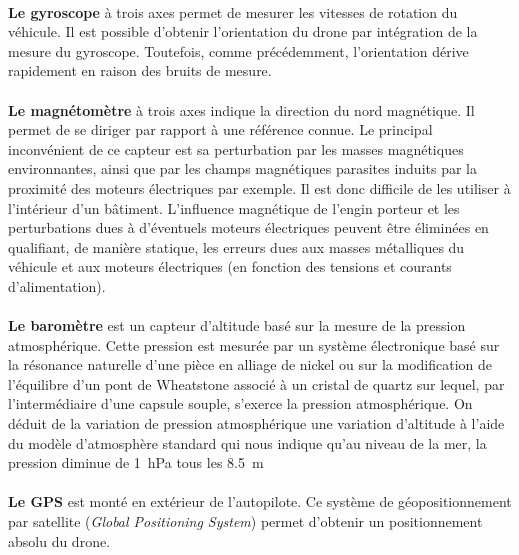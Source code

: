  \paragraph*{}
 \textbf{Le gyroscope} à trois axes permet de mesurer les vitesses de rotation du véhicule. Il est possible d'obtenir l'orientation du drone par intégration de la mesure du gyroscope. Toutefois, comme précédemment, l'orientation dérive rapidement en raison des bruits de mesure.

 \paragraph*{}
 \textbf{Le magnétomètre} à trois axes indique la direction du nord magnétique. Il permet de se diriger par rapport à une référence connue. Le principal inconvénient de ce capteur est sa perturbation par les masses magnétiques environnantes, ainsi que par les champs magnétiques parasites induits par la proximité des moteurs électriques par exemple. Il est donc difficile de les utiliser à l'intérieur d'un bâtiment. L'influence magnétique de l'engin porteur et les perturbations dues à d'éventuels moteurs électriques peuvent être éliminées en qualifiant, de manière statique, les erreurs dues aux masses métalliques du véhicule et aux moteurs électriques (en fonction des tensions et courants d'alimentation).

 \paragraph*{}

 \textbf{Le baromètre} est un capteur d'altitude basé sur la mesure de la pression atmosphérique. Cette pression est mesurée par un système électronique basé sur la résonance naturelle d'une pièce en alliage de nickel ou sur la modification de l'équilibre d'un pont de Wheatstone associé à un cristal de quartz sur lequel, par l'intermédiaire d'une capsule souple, s'exerce la pression atmosphérique. On déduit de la variation de pression atmosphérique une variation d'altitude à l'aide du modèle d'atmosphère standard qui nous indique qu'au niveau de la mer, la pression diminue de \SI{1}{\hecto\pascal} tous les \SI{8.5}{\meter}
 

 \paragraph*{}
 \textbf{Le GPS} est monté en extérieur de l'autopilote. Ce système de géopositionnement par satellite (\textit{Global Positioning System}) permet d'obtenir un positionnement absolu du drone. 

